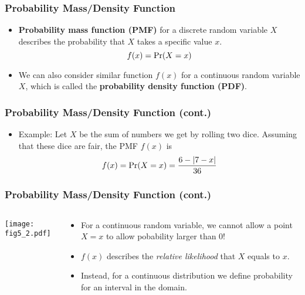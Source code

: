 \documentclass[pdflatex, 12pt]{beamer}
\begin{document}
\begin{frame}
\frametitle{Probability Mass/Density Function}
\begin{itemize}
\item \textbf{Probability mass function (PMF)} for a discrete random variable $X$ describes the probability that $X$ takes a specific value $x$.
 \begin{equation}
 f(x) = \Pr(X = x) \notag
 \end{equation}
\vspace{0.4cm}
\item We can also consider similar function $f(x)$ for a continuous random variable $X$, which is called the \textbf{probability density function (PDF)}.   
\end{itemize}
\end{frame}

\begin{frame}
\frametitle{Probability Mass/Density Function (cont.)}
\begin{itemize}
\item Example: Let $X$ be the sum of numbers we get by rolling two dice. Assuming that these dice are fair, the PMF $f(x)$ is
 \begin{equation}
 f(x) = \Pr(X = x) = \frac{6 - |7 - x|}{36} \notag
 \end{equation}
\end{itemize}
\end{frame}

\begin{frame}
\frametitle{Probability Mass/Density Function (cont.)}
\begin{columns}
\begin{column}{0.5\textwidth}
\texttt{[image: fig5\_2.pdf]}
\end{column}
\begin{column}{0.5\textwidth}
\begin{itemize}
\item For a continuous random variable, we cannot allow a point $X = x$ to allow pobability larger than 0!
\vspace{0.4cm}
\item $f(x)$ describes the \emph{relative likelihood} that $X$ equals to $x$.
\vspace{0.4cm}
\item Instead, for a continuous distribution we define probability for an interval in the domain.
\end{itemize}
\end{column}
\end{columns}
\end{frame}
\end{document}
